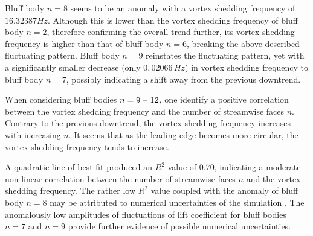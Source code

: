 Bluff body $n = 8$ seems to be an anomaly with a vortex shedding frequency of $16.32387 Hz$. Although this is lower than the vortex shedding frequency of bluff body $n = 2$, therefore confirming the overall trend further, its vortex shedding frequency is higher than that of bluff body $n = 6$, breaking the above described fluctuating pattern. Bluff body $n = 9$ reinstates the fluctuating pattern, yet with a significantly smaller decrease (only $0,02066\, Hz$) in vortex shedding frequency to bluff body $n = 7$, possibly indicating a shift away from the previous downtrend.

When considering bluff bodies $n = 9 \text{ \textendash\ } 12$, one identify a positive correlation between the vortex shedding frequency and the number of streamwise faces $n$. Contrary to the previous downtrend, the vortex shedding frequency increases with increasing $n$. It seems that as the leading edge becomes more circular, the vortex shedding frequency tends to increase.

A quadratic line of best fit produced an $R^2$ value of 0.70, indicating a moderate non-linear correlation between the number of streamwise faces $n$ and the vortex shedding frequency. The rather low $R^2$ value coupled with the anomaly of bluff body $n = 8$ may be attributed to numerical uncertainties of the simulation \parencite{city7565}. The anomalously low amplitudes of fluctuations of lift coefficient for bluff bodies $n = 7$ and $n = 9$ provide further evidence of possible numerical uncertainties.



